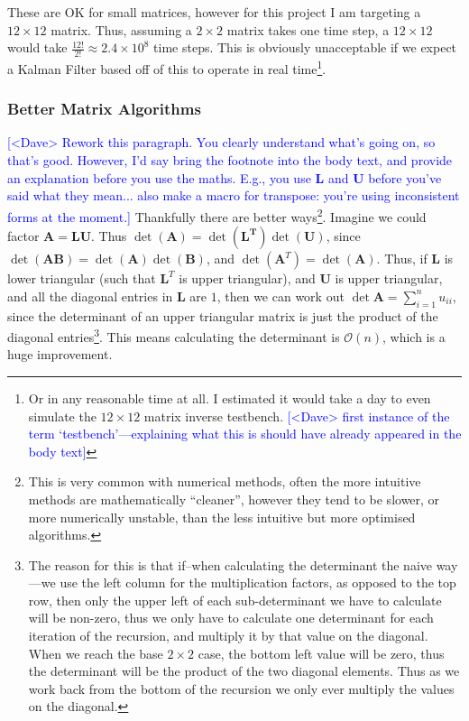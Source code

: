\documentclass[12pt]{article}
\newcommand{\note}[2][red]{\textcolor{#1}{#2}}
\newcommand{\notedme}[1]{\note[blue]{[<Dave> #1]}}
\begin{document}
These are OK for small matrices, however for this project I am targeting a $12 \times 12$ matrix. Thus, assuming a $2\times2$ matrix takes one time step, a $12 \times 12$ would take $\frac{12!}{2!} \approx 2.4 \times 10^8$ time steps. This is obviously unacceptable if we expect a Kalman Filter based off of this to operate in real time\footnote{Or in any reasonable time at all. I estimated it would take a day to even simulate the $12\times12$ matrix inverse testbench. \notedme{first instance of the term `testbench'---explaining what this is should have already appeared in the body text}}.

\subsubsection{Better Matrix Algorithms}
\label{lu}

\notedme{Rework this paragraph. You clearly understand what's going on, so that's good. However, I'd say bring the footnote into the body text, and provide an explanation before you use the maths. E.g., you use $\mathbf{L}$ and $\mathbf{U}$ before you've said what they mean... also make a macro for transpose: you're using inconsistent forms at the moment.}
Thankfully there are better ways\footnote{This is very common with numerical methods, often the more intuitive methods are mathematically ``cleaner'', however they tend to be slower, or more numerically unstable, than the less intuitive but more optimised algorithms.}. Imagine we could factor $\mathbf{A} = \mathbf{L}\mathbf{U}$. Thus $\det(\mathbf{A}) = \det(\mathbf{L^T}) \det(\mathbf{U})$, since $\det(\mathbf{AB}) = \det(\mathbf{A}) \det(\mathbf{B})$, and $\det(\mathbf{A}^T) = \det(\mathbf{A})$. Thus,  if $\mathbf{L}$ is lower triangular (such that $\mathbf{L}^T$ is upper triangular), and $\mathbf{U}$ is upper triangular, and all the diagonal entries in $\mathbf{L}$ are $1$, then we can work out $\det{\mathbf{A}}=\sum_{i=1}^{n}u_{ii}$, since the determinant of an upper triangular matrix is just the product of the diagonal entries\footnote{The reason for this is that if--when calculating the determinant the naive way---we use the left column for the multiplication factors, as opposed to the top row, then only the upper left of each sub-determinant we have to calculate will be non-zero, thus we only have to calculate one determinant for each iteration of the recursion, and multiply it by that value on the diagonal. When we reach the base $2\times2$ case, the bottom left value will be zero, thus the determinant will be the product of the two diagonal elements. Thus as we work back from the bottom of the recursion we only ever multiply the values on the diagonal.}. This means calculating the determinant is $\mathcal{O}(n)$, which is a huge improvement.
\end{document}
